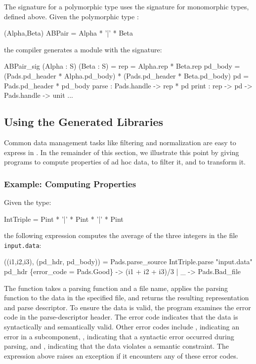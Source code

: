 The signature for a polymorphic \padsml{} type uses the signature
 for monomorphic types, defined above.  
Given the polymorphic \padsml{} type :
\begin{code}\scriptsize
{} (Alpha,Beta) ABPair = Alpha * '|' * Beta\end{code}%
the compiler generates a module with the signature:
\begin{code}\scriptsize
{}  ABPair_sig (Alpha : S) (Beta : S) = 
   rep      = Alpha.rep * Beta.rep
   pd\_body = (Pads.pd_header * Alpha.pd\_body) * 
                 (Pads.pd_header * Beta.pd\_body)
   pd       = Pads.pd_header * pd\_body
    parse    : Pads.handle -> rep * pd
    print    : rep -> pd -> Pads.handle -> unit
  ...
\end{code}%

\subsection{Using the Generated Libraries}
Common data management tasks like filtering and normalization are easy to express in \ocaml{}.  In the remainder of this section, we illustrate this point by giving \ocaml{} programs to compute properties of ad hoc data, to filter it, and to transform it.


\subsubsection{Example: Computing Properties}
\label{sec:ex-process}
Given the \padsml{} type:
\begin{code}\scriptsize
{} IntTriple = Pint * '|' * Pint * '|' * Pint\end{code}%
the following \ocaml{} expression computes the average of the three integers in the file \texttt{input.data}:
\begin{code}\scriptsize
{} ((i1,i2,i3), (pd_hdr, pd_body)) = 
 Pads.parse_source IntTriple.parse "input.data" 
 pd_hdr 
  \{error_code = Pads.Good\} -> (i1 + i2 + i3)/3
{|} _ ->  Pads.Bad_file \end{code}%
\noindent
The  function takes a parsing function and a file
name, applies the parsing function to the data in the specified file,
and returns the resulting representation and parse descriptor.  To
ensure the data is valid, the program examines the error code in the parse-descriptor header.  The error code  indicates that the data
is syntactically and semantically valid. Other error codes include
, indicating an error in a subcomponent, , indicating
that a syntactic error occurred during parsing, and ,
indicating that the data violates a semantic constraint. The
expression above raises an exception if it encounters any of these
error codes.

